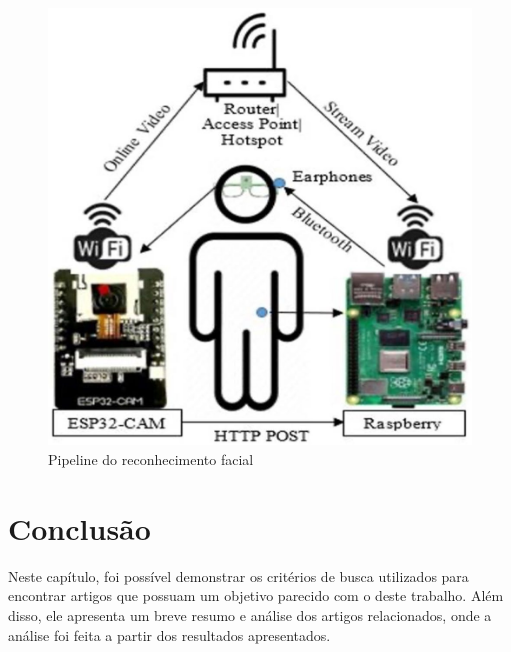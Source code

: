 \begin{figure}[htb]
	\begin{center}
		\includegraphics[scale=0.15]{Imagens/pipiline-espcam-alzheimer}
	\end{center}
	\caption {\label{pipeline_espcam}Pipeline do reconhecimento facial}
\end{figure}

\section{Conclusão}
Neste capítulo, foi possível demonstrar os critérios de busca utilizados para encontrar artigos que possuam um objetivo
parecido com o deste trabalho. Além disso, ele apresenta um breve resumo e análise dos artigos relacionados, onde a análise
foi feita a partir dos resultados apresentados.
